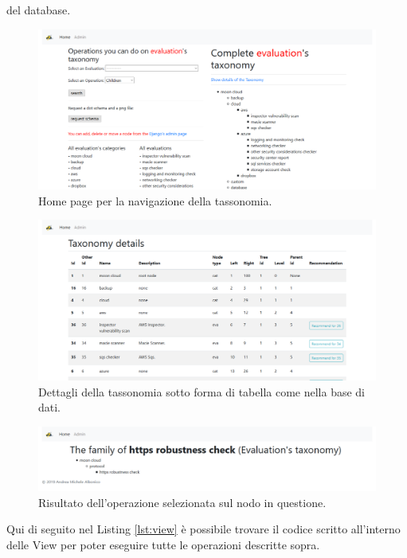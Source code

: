 del database.
\begin{figure}
    \includegraphics[scale=0.3]{images/MCRS_taxindex.png}
    \caption{Home page per la navigazione della tassonomia.}
    \label{fig:MCRS_taxindex}
\end{figure}
%
\begin{figure}
    \includegraphics[scale=0.3]{images/MCRS_taxdetails.png}
    \caption{Dettagli della tassonomia sotto forma di tabella come nella base di dati.}
    \label{fig:MCRS_taxdetails}
\end{figure}
%
\begin{figure}
    \includegraphics[scale=0.3]{images/MCRS_taxnodedetails.png}
    \caption{Risultato dell'operazione selezionata sul nodo in questione.}
    \label{fig:MCRS_taxnodedetails}
\end{figure}
%
\newpage
%
\hfill\break
Qui di seguito nel Listing \ref{lst:view} è possibile trovare il codice scritto all'interno delle View per poter eseguire tutte le 
operazioni descritte sopra.
\lstset{style=python_code_style}

